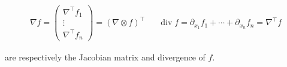 \documentclass[a4paper,10pt,twoside,leqno]{report}
\newcommand{\1}{\mathbbm{1}}
\begin{document}
\begin{equation}
  \label{eq:jacobian}
  \begin{aligned}
    \nabla f=\begin{pmatrix}
        \nabla^\intercal f_1 \\ \vdots \\ \nabla^\intercal f_n
    \end{pmatrix}=(\nabla \otimes f)^\intercal && 
    \operatorname{div} f=\partial_{x_1}f_1+\dotsm+\partial_{x_n}f_n=\nabla^\intercal f
    \end{aligned}
\end{equation}


are respectively the Jacobian matrix and divergence of $f$.


\end{document}
